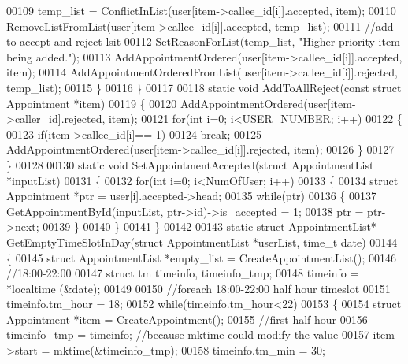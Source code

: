 \begin{DoxyCode}
00109         temp\_list = ConflictInList(user[item->callee\_id[i]].accepted, item);
00110         RemoveListFromList(user[item->callee\_id[i]].accepted, temp\_list);
00111         \textcolor{comment}{//add to accept and reject lsit}
00112         SetReasonForList(temp\_list, \textcolor{stringliteral}{"Higher priority item being added."});
00113         AddAppointmentOrdered(user[item->callee\_id[i]].accepted, item);
00114         AddAppointmentOrderedFromList(user[item->callee\_id[i]].rejected, temp\_list);
00115     \}
00116 \}
00117 
00118 \textcolor{keyword}{static} \textcolor{keywordtype}{void} AddToAllReject(\textcolor{keyword}{const} \textcolor{keyword}{struct} Appointment *item)
00119 \{
00120     AddAppointmentOrdered(user[item->caller\_id].rejected, item);
00121     \textcolor{keywordflow}{for}(\textcolor{keywordtype}{int} i=0; i<USER_NUMBER; i++)
00122     \{
00123         \textcolor{keywordflow}{if}(item->callee\_id[i]==-1)
00124             \textcolor{keywordflow}{break};
00125         AddAppointmentOrdered(user[item->callee\_id[i]].rejected, item);
00126     \}
00127 \}
00128 
00130 \textcolor{keyword}{static} \textcolor{keywordtype}{void} SetAppointmentAccepted(\textcolor{keyword}{struct} AppointmentList *inputList)
00131 \{
00132     \textcolor{keywordflow}{for}(\textcolor{keywordtype}{int} i=0; i<NumOfUser; i++)
00133     \{
00134         \textcolor{keyword}{struct }Appointment *ptr = user[i].accepted->head;
00135         \textcolor{keywordflow}{while}(ptr)
00136         \{
00137             GetAppointmentById(inputList, ptr->id)->is\_accepted = 1;
00138             ptr = ptr->next;
00139         \}
00140     \}
00141 \}
00142 
00143 \textcolor{keyword}{static} \textcolor{keyword}{struct }AppointmentList* GetEmptyTimeSlotInDay(\textcolor{keyword}{struct} AppointmentList *userList, time\_t date)
00144 \{
00145     \textcolor{keyword}{struct }AppointmentList *empty\_list = CreateAppointmentList();
00146     \textcolor{comment}{//18:00-22:00}
00147     \textcolor{keyword}{struct }tm timeinfo, timeinfo\_tmp;
00148     timeinfo = *localtime (&date);
00149 
00150     \textcolor{comment}{//foreach 18:00-22:00 half hour timeslot}
00151     timeinfo.tm\_hour = 18;
00152     \textcolor{keywordflow}{while}(timeinfo.tm\_hour<22)
00153     \{
00154         \textcolor{keyword}{struct }Appointment *item = CreateAppointment();
00155         \textcolor{comment}{//first half hour}
00156         timeinfo\_tmp = timeinfo;    \textcolor{comment}{//because mktime could modify the value}
00157         item->start = mktime(&timeinfo\_tmp);
00158         timeinfo.tm\_min = 30;

\end{DoxyCode}
